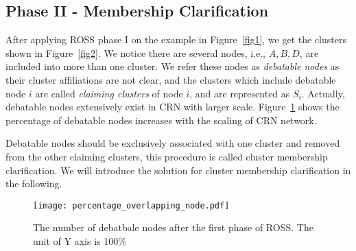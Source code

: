 \documentclass[journal,comsoc]{IEEEtran}
\makeatletter
\theoremstyle{mytheoremstyle}
\theoremstyle{mytheoremstyle}
\theoremstyle{mytheoremstyle}
\renewenvironment{proof}[1][\proofname]{%
      \par\pushQED{\qed}\fontfamily{ptm}\selectfont%
      \topsep6\p@\@plus6\p@\relax
      \trivlist\item[\hskip\labelsep\bfseries#1\@addpunct{.}]%
      \ignorespaces
    }{%
      \popQED\endtrivlist\@endpefalse
    }
\newcommand{\ie}{i.e., }
\makeatother
\begin{document}
\subsection{Phase II - Membership Clarification}
After applying ROSS phase I on the example in Figure~\ref{fig1}, we get the clusters shown in Figure~\ref{fig2}.
We notice there are several nodes, \ie $A, B, D$, are included into more than one cluster. 
We refer these nodes as \textit{debatable nodes} as their cluster affiliations are not clear, and the clusters which include debatable node $i$ are called \textit{claiming clusters} of node $i$, and are represented as $S_i$.  
Actually, debatable nodes extensively exist in CRN with larger scale.
Figure~\ref{percentage_overlapping_node} shows the percentage of debatable nodes increases with the scaling of CRN network.

Debatable nodes should be exclusively associated with one cluster and removed from the other claiming clusters, this procedure is called cluster membership clarification.
We will introduce the solution for cluster membership clarification in the following.

\begin{figure}[ht!]
  \centering
  \texttt{[image: percentage\_overlapping\_node.pdf]}
  \caption{The number of debatbale nodes after the first phase of ROSS. The unit of Y axis is 100\%}\label{percentage_overlapping_node}
\end{figure}





%
\end{document}
